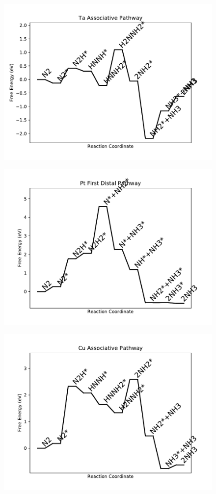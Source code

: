 \begin{figure}
\includegraphics[width=0.8\linewidth]{data/plots/Ta_associative.pdf}
\end{figure}

\begin{figure}
\includegraphics[width=0.8\linewidth]{data/plots/Pt_distal_1.pdf}
\end{figure}

\begin{figure}
\includegraphics[width=0.8\linewidth]{data/plots/Cu_associative.pdf}
\end{figure}

